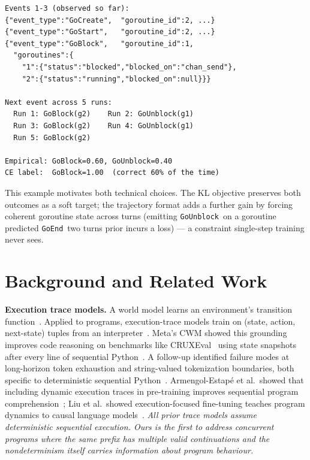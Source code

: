 \documentclass[10pt,conference]{IEEEtran}
\newcommand{\eunblock}{\texttt{GoUnblock}}
\newcommand{\eend}{\texttt{GoEnd}}
\begin{document}
\begin{lstlisting}[float, caption={Partial trace: the next event is
nondeterministic (GoBlock or GoUnblock), and five runs reveal an
empirical distribution that a single-step label cannot represent.},
label={lst:motiv}]
Events 1-3 (observed so far):
{"event_type":"GoCreate",  "goroutine_id":2, ...}
{"event_type":"GoStart",   "goroutine_id":2, ...}
{"event_type":"GoBlock",   "goroutine_id":1,
  "goroutines":{
    "1":{"status":"blocked","blocked_on":"chan_send"},
    "2":{"status":"running","blocked_on":null}}}

Next event across 5 runs:
  Run 1: GoBlock(g2)    Run 2: GoUnblock(g1)
  Run 3: GoBlock(g2)    Run 4: GoUnblock(g1)
  Run 5: GoBlock(g2)

Empirical: GoBlock=0.60, GoUnblock=0.40
CE label:  GoBlock=1.00  (correct 60% of the time)
\end{lstlisting}

This example motivates both technical choices.
The KL objective preserves both outcomes as a soft target; the
trajectory format adds a further gain by forcing coherent goroutine
state across turns (emitting \eunblock\ on a goroutine predicted \eend\
two turns prior incurs a loss) — a constraint single-step training
never sees.

\section{Background and Related Work}\label{sec:related}

\textbf{Execution trace models.}
A world model learns an environment's transition function~\cite{cwm}.
Applied to programs, execution-trace models train on (state, action,
next-state) tuples from an interpreter~\cite{cwm,exectuning,codeexec}.
Meta's CWM showed this grounding improves code reasoning on benchmarks like CRUXEval~\cite{gu2024cruxeval} using state
snapshots after every line of sequential Python~\cite{cwm}.
A follow-up identified failure modes at long-horizon token exhaustion
and string-valued tokenization boundaries, both specific to
deterministic sequential Python~\cite{debugcwm}.
Armengol-Estap\'{e} et al.\ showed that including dynamic execution
traces in pre-training improves sequential program
comprehension~\cite{exectuning}; Liu et al.\ showed execution-focused
fine-tuning teaches program dynamics to causal language
models~\cite{codeexec}.
\textit{All prior trace models assume deterministic sequential
execution.
Ours is the first to address concurrent programs where the same prefix
has multiple valid continuations and the nondeterminism itself carries
information about program behaviour.}
\end{document}
